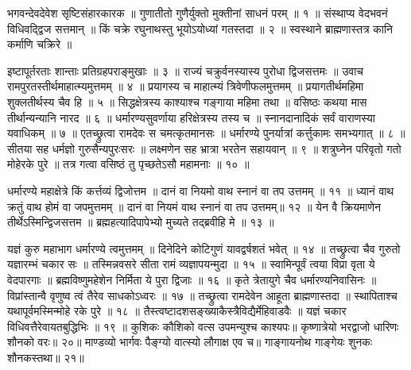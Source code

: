 
भगवन्देवदेवेश सृष्टिसंहारकारक ॥
गुणातीतो गुणैर्युक्तो मुक्तीनां साधनं परम् ॥ १ ॥
संस्थाप्य वेदभवनं विधिवद्द्विज सत्तमान् ॥
किं चक्रे रघुनाथस्तु भूयोऽयोध्यां गतस्तदा ॥ २ ॥
स्वस्थाने ब्राह्मणास्तत्र कानि कर्माणि चक्रिरे ॥

इष्टापूर्तरताः शान्ताः प्रतिग्रहपराङ्मुखाः ॥ ३ ॥
राज्यं चक्रुर्वनस्यास्य पुरोधा द्विजसत्तमः ॥
उवाच रामपुरतस्तीर्थमाहात्म्यमुत्तमम् ॥ ४ ॥
प्रयागस्य च माहात्म्यं त्रिवेणीफलमुत्तमम् ॥
प्रयागतीर्थमहिमा शुक्लतीर्थस्य चैव हि ॥ ५ ॥
सिद्धक्षेत्रस्य काश्याश्च गङ्गाया महिमा तथा ॥
वसिष्ठः कथया मास तीर्थान्यन्यानि नारद ॥ ६ ॥
धर्मारण्यसुवर्णाया हरिक्षेत्रस्य तस्य च ॥
स्नानदानादिकं सर्वं वाराणस्या यवाधिकम् ॥ ७ ॥
एतच्छ्रुत्वा रामदेवः स चमत्कृतमानसः ॥
धर्मारण्ये पुनर्यात्रां कर्त्तुकामः समभ्यगात् ॥ ८ ॥
सीतया सह धर्मज्ञो गुरुसैन्यपुरःसरः ॥
लक्ष्मणेन सह भ्रात्रा भरतेन सहायवान् ॥ ९ ॥
शत्रुघ्नेन परिवृतो गतो मोहेरके पुरे ॥
तत्र गत्वा वसिष्ठं तु पृच्छतेऽसौ महामनाः ॥ १० ॥

धर्मारण्ये महाक्षेत्रे किं कर्त्तव्यं द्विजोत्तम ॥
दानं वा नियमो वाथ स्नानं वा तप उत्तमम् ॥ ११ ॥
ध्यानं वाथ क्रतुं वाथ होमं वा जपमुत्तमम् ॥
दानं वा नियमं वाथ स्नानं वा तप उत्तमम्॥ १२ ॥
येन वै क्रियमाणेन तीर्थेऽस्मिन्द्विजसत्तम ॥
ब्रह्महत्यादिपापेभ्यो मुच्यते तद्ब्रवीहि मे ॥ १३ ॥

यज्ञं कुरु महाभाग धर्मारण्ये त्वमुत्तमम् ॥
दिनेदिने कोटिगुणं यावद्वर्षशतं भवेत् ॥ १४ ॥
तच्छ्रुत्वा चैव गुरुतो यज्ञारम्भं चकार सः ॥
तस्मिन्नवसरे सीता रामं व्यज्ञापयन्मुदा ॥ १५ ॥
स्वामिन्पूर्वं त्वया विप्रा वृता ये वेदपारगाः ॥
ब्रह्मविष्णुमहेशेन निर्मिता ये पुरा द्विजाः ॥ १६ ॥
कृते त्रेतायुगे चैव धर्मारण्यनिवासिनः ॥
विप्रांस्तान्वै वृणुष्व त्वं तैरेव साधकोऽध्वरः ॥ १७ ॥
तच्छ्रुत्वा रामदेवेन आहूता ब्राह्मणास्तदा ॥
स्थापिताश्च यथापूर्वमस्मिन्मोहे रके पुरे ॥ १८ ॥
तैस्त्वष्टादशसङ्ख्याकैस्त्रैविद्यैर्मेहिवाडवैः ॥
यज्ञं चकार विधिवत्तैरेवायतबुद्धिभिः ॥ १९ ॥
कुशिकः कौशिको वत्स उपमन्युश्च काश्यपः॥
कृष्णात्रेयो भरद्वाजो धारिणः शौनको वरः॥ २०॥
माण्डव्यो भार्गवः पैङ्ग्यो वात्स्यो लौगाक्ष एव च॥
गाङ्गायनोथ गाङ्गेयः शुनकः शौनकस्तथा॥ २१॥

